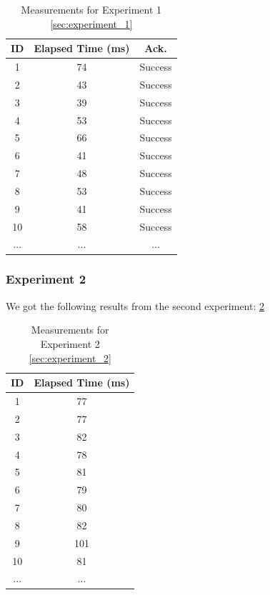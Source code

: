 \begin{table}[ht]
    \centering
    \begin{tabular}{ccc}
       \textbf{ID} & \textbf{Elapsed Time (ms)} & \textbf{Ack.} \\ \hline
       1 & 74 & Success \\
       2 & 43 & Success \\
       3 & 39 & Success \\
       4 & 53 & Success \\
       5 & 66 & Success \\
       6 & 41 & Success \\
       7 & 48 & Success \\
       8 & 53 & Success \\
       9 & 41 & Success \\
       10 & 58 & Success \\
       ... & ... & ... \\
    \hline
    \end{tabular}
    \caption{Measurements for Experiment 1 \ref{sec:experiment_1}}
    \label{tab:experiment_1_results}
\end{table}

\subsubsection{Experiment 2}
We got the following results from the second experiment: \ref{tab:experiment_2_results}
\begin{table}[ht]
    \centering
    \begin{tabular}{cc}
       \textbf{ID} & \textbf{Elapsed Time (ms)} \\ \hline
       1 & 77 \\
       2 & 77 \\
       3 & 82 \\
       4 & 78 \\
       5 & 81 \\
       6 & 79 \\
       7 & 80 \\
       8 & 82 \\
       9 & 101 \\
       10 & 81 \\
       ... & ... \\
    \hline
    \end{tabular}
    \caption{Measurements for Experiment 2 \ref{sec:experiment_2}}
    \label{tab:experiment_2_results}
\end{table}

